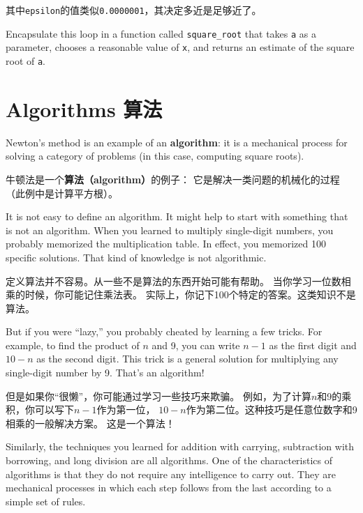 \documentclass[10pt]{book}
\begin{document}
\begin{CJK}{UTF8}{gbsn}
其中\verb"epsilon"的值类似{\tt 0.0000001}，其决定多近是足够近了。

\begin{exercise}

Encapsulate this loop in a function called \verb"square_root"
that takes {\tt a} as a parameter, chooses a reasonable
value of {\tt x}, and returns an estimate of the square root
of {\tt a}.

\end{exercise}


\section{Algorithms 算法}

Newton's method is an example of an {\bf algorithm}: it is a
mechanical process for solving a category of problems (in this
case, computing square roots).

牛顿法是一个{\bf 算法（algorithm）}的例子：
它是解决一类问题的机械化的过程（此例中是计算平方根）。

It is not easy to define an algorithm.  It might help to start
with something that is not an algorithm.  When you learned
to multiply single-digit numbers, you probably memorized the
multiplication table.  In effect, you memorized 100 specific solutions.
That kind of knowledge is not algorithmic.

定义算法并不容易。从一些不是算法的东西开始可能有帮助。
当你学习一位数相乘的时候，你可能记住乘法表。
实际上，你记下100个特定的答案。这类知识不是算法。

But if you were ``lazy,'' you probably cheated by learning a few
tricks.  For example, to find the product of $n$ and 9, you can
write $n-1$ as the first digit and $10-n$ as the second
digit.  This trick is a general solution for multiplying any
single-digit number by 9.  That's an algorithm!

但是如果你``很懒''，你可能通过学习一些技巧来欺骗。
例如，为了计算$n$和9的乘积，你可以写下$n-1$作为第一位，
$10-n$作为第二位。这种技巧是任意位数字和9相乘的一般解决方案。
这是一个算法！

Similarly, the techniques you learned for addition with carrying,
subtraction with borrowing, and long division are all algorithms.  One
of the characteristics of algorithms is that they do not require any
intelligence to carry out.  They are mechanical processes in which
each step follows from the last according to a simple set of rules.


\end{CJK}
\end{document}
